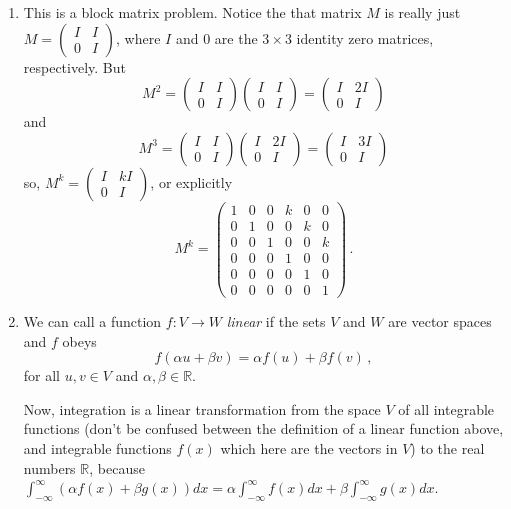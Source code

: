 \begin{enumerate}
\item This is a block matrix problem. Notice the that matrix $M$ is really just $M=
\begin{pmatrix}
I&I\\0&I
\end{pmatrix}
$, where $I$ and $0$ are the $3\times3$ identity zero matrices, respectively. But
\[
M^2=\begin{pmatrix}
I&I\\0&I
\end{pmatrix}
\begin{pmatrix}
I&I\\0&I
\end{pmatrix}
=
\begin{pmatrix}
I&2I\\0&I
\end{pmatrix}
\]
and 
\[
M^3=\begin{pmatrix}
I&I\\0&I
\end{pmatrix}
\begin{pmatrix}
I&2I\\0&I
\end{pmatrix}
=
\begin{pmatrix}
I&3I\\0&I
\end{pmatrix}
\]
so, $M^k=\begin{pmatrix}
I&kI\\0&I
\end{pmatrix}$, or explicitly
\[
M^k=
\begin{pmatrix}
1&0&0&k&0&0\\
0&1&0&0&k&0\\
0&0&1&0&0&k\\
0&0&0&1&0&0\\
0&0&0&0&1&0\\
0&0&0&0&0&1
\end{pmatrix}\, .
\]


\item We can call a function $f\colon V\longrightarrow W$ {\itshape linear} if the sets $V$ and $W$ are vector spaces
and $f$ obeys
\[
f(\alpha u + \beta v)=\alpha f(u)+\beta f(v)\, ,
\]
for all $u,v\in V$ and $\alpha,\beta\in {\mathbb R}$.

Now, integration is a linear transformation from 
the space $V$ of all integrable functions (don't be confused between the definition of a linear function above, 
and integrable functions $f(x)$ which here are the vectors in $V$) to the real numbers ${\mathbb R}$, because 
$\int_{-\infty}^\infty (\alpha f(x) +\beta g(x))dx = \alpha \int_{-\infty}^\infty f(x) dx + \beta \int_{-\infty}^\infty g(x) dx$.


\end{enumerate}
